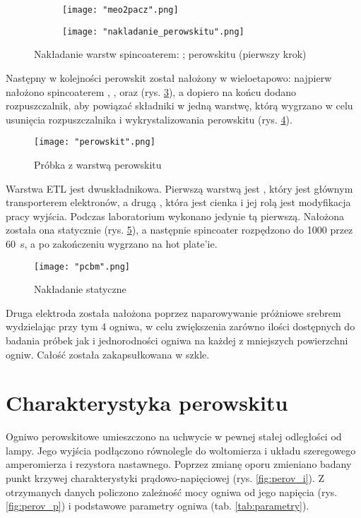 \documentclass[a4, 12pt]{article}
\begin{document}
	\begin{figure}[H]
		\centering
		\begin{subfigure}{0.45\textwidth}
			\centering
			\texttt{[image: "meo2pacz".png]}
			\caption{\label{fig:nakladanie_meo2pacz}}
		\end{subfigure}
		\begin{subfigure}{0.45\textwidth}
			\centering
			\texttt{[image: "nakladanie\_perowskitu".png]}
			\caption{\label{fig:nakladanie_perowskitu}}
		\end{subfigure}
		\captionsetup{subrefformat=parens}
		\caption{Nakładanie warstw spincoaterem:  ;  perowskitu (pierwszy krok)}
	\end{figure}
	Następny w kolejności perowskit został nałożony w wieloetapowo: najpierw nałożono spincoaterem , ,  oraz  (rys. \ref{fig:nakladanie_perowskitu}), a dopiero na końcu dodano rozpuszczalnik, aby powiązać składniki w jedną warstwę, którą wygrzano w celu usunięcia rozpuszczalnika i wykrystalizowania perowskitu (rys. \ref{fig:perowskit}). 
	\begin{figure}[H]
		\centering
		\texttt{[image: "perowskit".png]}
		\caption{Próbka z warstwą perowskitu}
		\label{fig:perowskit}
	\end{figure}
	Warstwa ETL jest dwuskładnikowa. Pierwszą warstwą jest , który jest głównym transporterem elektronów, a drugą \textemdash {}, która jest cienka i jej rolą jest modyfikacja pracy wyjścia. Podczas laboratorium wykonano jedynie tą pierwszą. Nałożona została ona statycznie (rys. \ref{fig:pcbm}), a następnie spincoater rozpędzono do \qty{1000}{\rpm} przez \qty{60}{\s}, a po zakończeniu wygrzano na hot plate'ie. 
	
	\begin{figure}[H]
		\centering
		\texttt{[image: "pcbm".png]}
		\caption{Nakładanie statyczne }
		\label{fig:pcbm}
	\end{figure}
	
	Druga elektroda została nałożona poprzez naparowywanie próżniowe srebrem wydzielając przy tym 4 ogniwa, w celu zwiększenia zarówno ilości dostępnych do badania próbek jak i jednorodności ogniwa na każdej z mniejszych powierzchni ogniw. Całość została zakapsułkowana w szkle. 
	
	\section{Charakterystyka perowskitu}
	Ogniwo perowskitowe umieszczono na uchwycie w pewnej stałej odległości od lampy. Jego wyjścia podłączono równolegle do woltomierza i układu szeregowego amperomierza i rezystora nastawnego. Poprzez zmianę oporu zmieniano badany punkt krzywej charakterystyki prądowo-napięciowej (rys. \ref{fig:perov_i}). Z otrzymanych danych policzono zależność mocy ogniwa od jego napięcia (rys. \ref{fig:perov_p}) i podstawowe parametry ogniwa (tab. \ref{tab:parametry}). 
	
\end{document}
